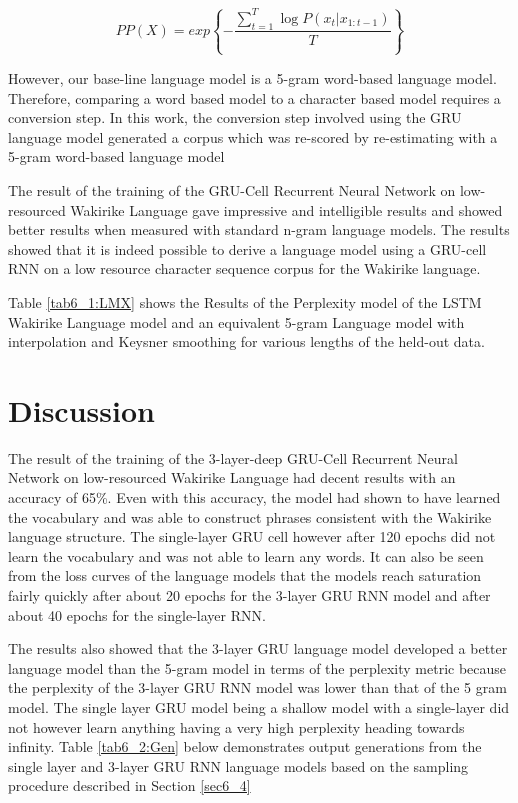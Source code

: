 \begin{equation}
    PP(X)=exp\left\{−\frac{\sum_{t=1}^T\log P(x_t|x_{1:t−1})}{T}\right\}
\label{ch5_eq3_ppx}
\end{equation}

However, our base-line language model is a 5-gram word-based language model.  Therefore, comparing a word based model to a character based model requires a conversion step. In this work, the conversion step involved using the GRU language model generated a corpus which was re-scored by re-estimating with a 5-gram word-based language model

The result of the training of the GRU-Cell Recurrent Neural Network on low-resourced Wakirike Language gave impressive and intelligible results and showed better results when measured with standard n-gram language models. The results showed that it is indeed possible to derive a language model using a GRU-cell RNN on a low resource character sequence corpus for the Wakirike language.
\stopblue

Table \ref{tab6_1:LMX} shows the Results of the Perplexity model of the LSTM Wakirike Language model and an equivalent 5-gram Language model with interpolation and Keysner smoothing \citep{chen1996empirical} for various lengths of the held-out data.
\startblue
\section{Discussion}
The result of the training of the 3-layer-deep GRU-Cell Recurrent Neural Network on low-resourced Wakirike Language had decent results with an accuracy of 65\%.  Even with this accuracy, the model had shown to have learned the vocabulary and was able to construct phrases consistent with the Wakirike language structure.  The single-layer GRU cell however after 120 epochs did not learn the vocabulary and was not able to learn any words.  It can also be seen from the loss curves of the language models that the models reach saturation fairly quickly after about 20 epochs for the 3-layer GRU RNN model and after about 40 epochs for the single-layer RNN.


The results also showed that the 3-layer GRU language model developed a better language model than the 5-gram model in terms of the perplexity metric because the perplexity of the 3-layer GRU RNN model was lower than that of the 5 gram model.  The single layer GRU model being a shallow model with a single-layer did not however learn anything having a  very high perplexity heading towards infinity.  Table \ref{tab6_2:Gen} below demonstrates output generations from the single layer and 3-layer GRU RNN language models based on the sampling procedure described in Section \ref{sec6_4}

